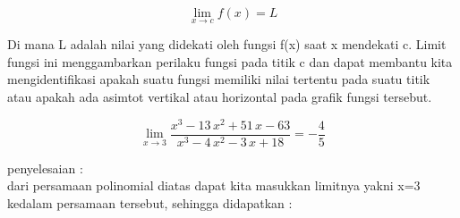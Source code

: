 \documentclass[a4paper,10pt]{article}
\begin{document}
\begin{eulernotebook}
\begin{eulercomment}
\begin{eulercomment}
\begin{eulercomment}
\begin{eulercomment}
\begin{eulercomment}
\begin{eulercomment}
\begin{eulercomment}
\end{eulercomment}
\begin{eulerformula}
\[
\lim_{x \to c} f(x) = L
\]
\end{eulerformula}
\begin{eulercomment}
Di mana L adalah nilai yang didekati oleh fungsi f(x) saat x mendekati
c. Limit fungsi ini menggambarkan perilaku fungsi pada titik c dan
dapat membantu kita mengidentifikasi apakah suatu fungsi memiliki
nilai tertentu pada suatu titik atau apakah ada asimtot vertikal atau
horizontal pada grafik fungsi tersebut.
\end{eulercomment}
\begin{eulerformula}
\[
\lim_{x\rightarrow 3}{\frac{x^3-13\,x^2+51\,x-63}{x^3-4\,x^2-3\,x+
 18}}=-\frac{4}{5}
\]
\end{eulerformula}
\begin{eulercomment}
penyelesaian :\\
dari persamaan polinomial diatas dapat kita masukkan limitnya yakni
x=3 kedalam persamaan tersebut, sehingga didapatkan :


\end{eulercomment}
\end{eulercomment}
\end{eulercomment}
\end{eulercomment}
\end{eulercomment}
\end{eulercomment}
\end{eulercomment}
\end{eulernotebook}
\end{document}
